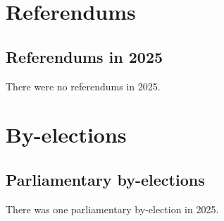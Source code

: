 \documentclass[a4paper,openany]{book}
\begin{document}



\part{Referendums}

\chapter{Referendums in 2025}

There were no referendums in 2025.




\part{By-elections}

\chapter{Parliamentary by-elections}

There was one parliamentary by-election in 2025.
%
%
%
%
\end{document}
